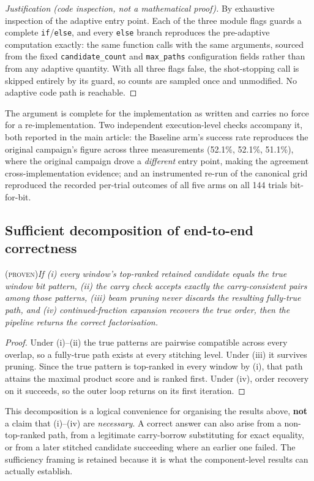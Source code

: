 \documentclass[final,5p,times,longtitle]{elsarticle}
\theoremstyle{plain}
\newcommand{\PROVEN}{\textsc{(proven)}}
\begin{document}
\begin{proof}[Justification (code inspection, not a mathematical proof)]
By exhaustive inspection of the adaptive entry point. Each of the three
module flags guards a complete \texttt{if}/\texttt{else}, and every
\texttt{else} branch reproduces the pre-adaptive computation exactly:
the same function calls with the same arguments, sourced from the fixed
\texttt{candidate\_count} and \texttt{max\_paths} configuration fields
rather than from any adaptive quantity. With all three flags false, the
shot-stopping call is skipped entirely by its guard, so counts are
sampled once and unmodified. No adaptive code path is reachable.
\end{proof}

\noindent
The argument is complete for the implementation as written and carries no
force for a re-implementation. Two independent execution-level checks
accompany it, both reported in the main article: the Baseline arm's
success rate reproduces the original campaign's figure across three
measurements (52.1\%, 52.1\%, 51.1\%), where the original campaign drove
a \emph{different} entry point, making the agreement cross-implementation
evidence; and an instrumented re-run of the canonical grid reproduced the
recorded per-trial outcomes of all five arms on all 144 trials
bit-for-bit.

\subsection{Sufficient decomposition of end-to-end correctness}
\PROVEN{}\quad\textit{If (i) every window's top-ranked retained candidate
equals the true window bit pattern, (ii) the carry check accepts exactly
the carry-consistent pairs among those patterns, (iii) beam pruning never
discards the resulting fully-true path, and (iv) continued-fraction
expansion recovers the true order, then the pipeline returns the correct
factorisation.}

\begin{proof}
Under (i)--(ii) the true patterns are pairwise compatible across every
overlap, so a fully-true path exists at every stitching level. Under
(iii) it survives pruning. Since the true pattern is top-ranked in every
window by (i), that path attains the maximal product score and is ranked
first. Under (iv), order recovery on it succeeds, so the outer loop
returns on its first iteration.
\end{proof}

\noindent
This decomposition is a logical convenience for organising the results
above, \textbf{not} a claim that (i)--(iv) are \emph{necessary}. A correct
answer can also arise from a non-top-ranked path, from a legitimate
carry-borrow substituting for exact equality, or from a later stitched
candidate succeeding where an earlier one failed. The sufficiency framing
is retained because it is what the component-level results can actually
establish.
\end{document}
